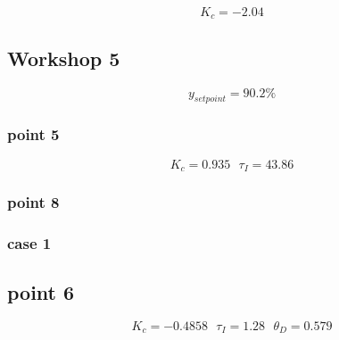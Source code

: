 $$ K_{c}= -2.04 $$


\subsection{Workshop 5}

$$ y_{setpoint}= 90.2\% $$

\subsubsection{point 5}

$$ K_{c}= 0.935  \, \, \, \,  \tau_{I}= 43.86 $$

\subsubsection{point 8}

\subsubsection{case 1}

\subsection{point 6}

$$ K_{c}= -0.4858  \, \, \, \, \tau_{I}= 1.28 \, \, \, \, \theta_{D}= 0.579$$



